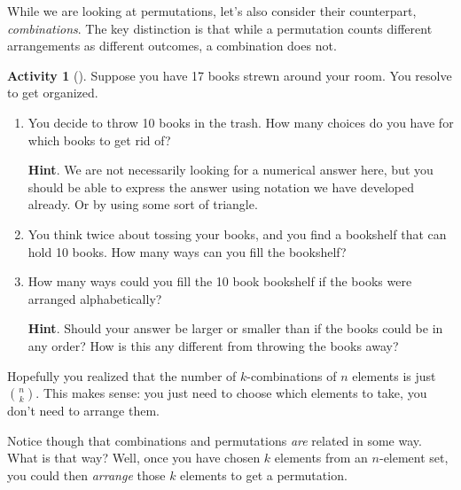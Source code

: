 \documentclass[10pt,]{book}
\theoremstyle{plain}
\theoremstyle{definition}
\theoremstyle{definition}
\theoremstyle{definition}
\newtheorem{activity}[project]{Activity}
\numberwithin{equation}{chapter}
\begin{document}
%
\par
\hypertarget{p-659}{}%
While we are looking at permutations, let's also consider their counterpart, \emph{combinations}. The key distinction is that while a permutation counts different arrangements as different outcomes, a combination does not.%
\begin{activity}[]\label{activity-84}
\hypertarget{p-660}{}%
Suppose you have 17 books strewn around your room.  You resolve to get organized.%
\begin{enumerate}[font=\bfseries,label=(\alph*),ref=\alph*]
\item\label{task-133} \hypertarget{p-661}{}%
You decide to throw 10 books in the trash.  How many choices do you have for which books to get rid of?%
\par\smallskip%
\noindent\textbf{Hint}.\hypertarget{hint-45}{}\quad%
\hypertarget{p-662}{}%
We are not necessarily looking for a numerical answer here, but you should be able to express the answer using notation we have developed already.  Or by using some sort of triangle.%
\item\label{task-134} \hypertarget{p-663}{}%
You think twice about tossing your books, and you find a bookshelf that can hold 10 books.  How many ways can you fill the bookshelf?%
\item\label{task-135} \hypertarget{p-664}{}%
How many ways could you fill the 10 book bookshelf if the books were arranged alphabetically?%
\par\smallskip%
\noindent\textbf{Hint}.\hypertarget{hint-46}{}\quad%
\hypertarget{p-665}{}%
Should your answer be larger or smaller than if the books could be in any order?  How is this any different from throwing the books away?%
\end{enumerate}
\end{activity}
\hypertarget{p-666}{}%
Hopefully you realized that the number of \(k\)-combinations of \(n\) elements is just \(\binom{n}{k}\).  This makes sense: you just need to choose which elements to take, you don't need to arrange them.%
\par
\hypertarget{p-667}{}%
Notice though that combinations and permutations \emph{are} related in some way.  What is that way?  Well, once you have chosen \(k\) elements from an \(n\)-element set, you could then \emph{arrange} those \(k\) elements to get a permutation.%
\end{document}
